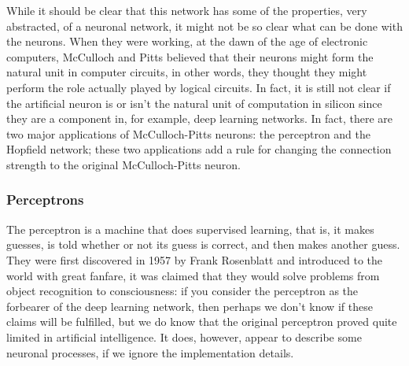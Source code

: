 \documentclass[12pt]{article}
\begin{document}
While it should be clear that this network has some of the properties,
very abstracted, of a neuronal network, it might not be so clear what
can be done with the neurons. When they were working, at the dawn of
the age of electronic computers, McCulloch and Pitts believed that
their neurons might form the natural unit in computer circuits, in
other words, they thought they might perform the role actually played
by logical circuits. In fact, it is still not clear if the artificial
neuron is or isn't the natural unit of computation in silicon since
they are a component in, for example, deep learning networks. In fact,
there are two major applications of McCulloch-Pitts neurons: the
perceptron and the Hopfield network; these two applications add a rule
for changing the connection strength to the original McCulloch-Pitts
neuron.

\subsubsection*{Perceptrons}

The perceptron is a machine that does supervised learning, that is, it
makes guesses, is told whether or not its guess is correct, and then
makes another guess. They were first discovered in 1957 by Frank
Rosenblatt \cite{Rosenblatt1958} and introduced to the world with great fanfare, it was
claimed that they would solve problems from object recognition to
consciousness: if you consider the perceptron as the forbearer of the
deep learning network, then perhaps we don't know if these claims will
be fulfilled, but we do know that the original perceptron proved quite
limited in artificial intelligence. It does, however, appear to
describe some neuronal processes, if we ignore the implementation
details.
\end{document}
